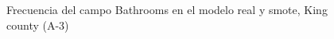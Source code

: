 \begin{figure}[H]
    \centering
    
    \caption{Frecuencia del campo Bathrooms en el modelo real y smote, King county (A-3)}
    \label{frecuency-smote-bathrooms}
\end{figure}